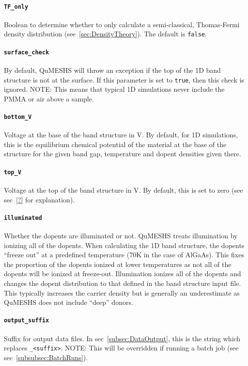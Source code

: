 \documentclass[12pt]{article}
\begin{document}
\paragraph{\texttt{TF\_only}}
Boolean to determine whether to only calculate a semi-classical, Thomas-Fermi density
distribution (see~\ref{sec:DensityTheory}).  The default is \texttt{false}.

\paragraph{\texttt{surface\_check}}
By default, QuMESHS will throw an exception if the top of the 1D band structure is not at
the surface.  If this parameter is set to \texttt{true}, then this check is ignored.
{\color{red} NOTE:} This means that typical 1D simulations never include the PMMA or air
above a sample.

\paragraph{\texttt{bottom\_V}}
Voltage at the base of the band structure in V.  By default, for 1D simulations, this is
the equilibrium chemical potential of the material at the base of the structure for the
given band gap, temperature and dopent densities given there.

\paragraph{\texttt{top\_V}}
Voltage at the top of the band structure in V.  By default, this is set to zero (see
sec~\ref{?} for explanation).

\paragraph{\texttt{illuminated}}
Whether the dopents are illuminated or not.  QuMESHS treats illumination by ionizing all
of the dopents.  When calculating the 1D band structure, the dopents ``freeze out'' at
a predefined temperature (70K in the case of AlGaAs).  This fixes the proportion of the
dopents ionized at lower temperatures as not all of the dopents will be ionized at
freeze-out.  Illumination ionizes all of the dopents and changes the dopent distribution
to that defined in the band structure input file.  This typically increases the carrier
density but is generally an underestimate as QuMESHS does not include ``deep'' donors.

\paragraph{\texttt{output\_suffix}}
Suffix for output data files.  In sec~\ref{subsec:DataOutput}, this is the string which
replaces \texttt{\_<suffix>}. {\color{red} NOTE:} This will be overridden if running
a batch job (see sec~\ref{subsubsec:BatchRuns}).
\end{document}
